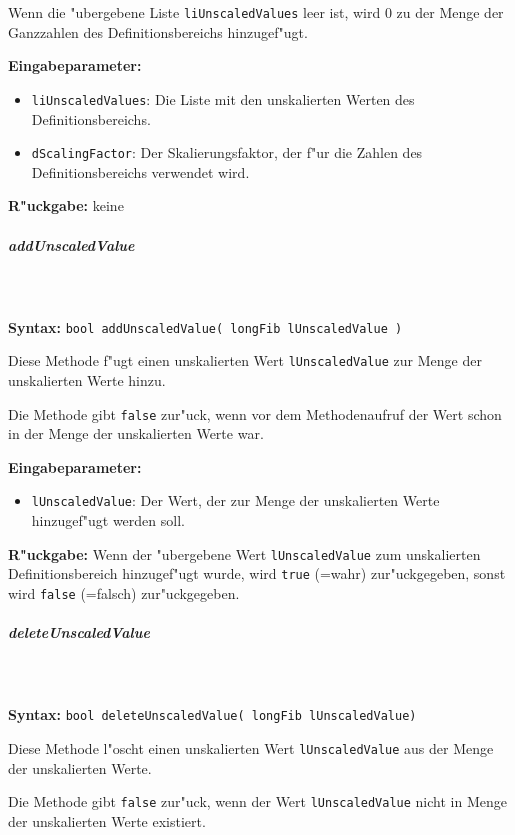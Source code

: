 Wenn die "ubergebene Liste \verb|liUnscaledValues| leer ist, wird $0$ zu der Menge der Ganzzahlen des Definitionsbereichs hinzugef"ugt.

\bigskip\noindent
\textbf{Eingabeparameter:}
\begin{itemize}
 \item \verb|liUnscaledValues|: Die Liste mit den unskalierten Werten des Definitionsbereichs.
 \item \verb|dScalingFactor|: Der Skalierungsfaktor, der f"ur die Zahlen des Definitionsbereichs verwendet wird.
\end{itemize}

\bigskip\noindent
\textbf{R"uckgabe:} keine


\subparagraph{addUnscaledValue}

\ \\\\\noindent
\textbf{Syntax:} \verb|bool addUnscaledValue( longFib lUnscaledValue )|

\bigskip\noindent
Diese Methode f"ugt einen unskalierten Wert \verb|lUnscaledValue| zur Menge der unskalierten Werte hinzu.

Die Methode gibt \verb|false| zur"uck, wenn vor dem Methodenaufruf der Wert schon in der Menge der unskalierten Werte war.

\bigskip\noindent
\textbf{Eingabeparameter:}
\begin{itemize}
 \item \verb|lUnscaledValue|: Der Wert, der zur Menge der unskalierten Werte hinzugef"ugt werden soll.
\end{itemize}

\bigskip\noindent
\textbf{R"uckgabe:}  Wenn der "ubergebene Wert \verb|lUnscaledValue| zum unskalierten Definitionsbereich hinzugef"ugt wurde, wird \verb|true| (=wahr) zur"uckgegeben, sonst wird \verb|false| (=falsch) zur"uckgegeben.


\subparagraph{deleteUnscaledValue}

\ \\\\\noindent
\textbf{Syntax:} \verb|bool deleteUnscaledValue( longFib lUnscaledValue)|

\bigskip\noindent
Diese Methode l"oscht einen unskalierten Wert \verb|lUnscaledValue| aus der Menge der unskalierten Werte.

Die Methode gibt \verb|false| zur"uck, wenn der Wert \verb|lUnscaledValue| nicht in Menge der unskalierten Werte existiert.

